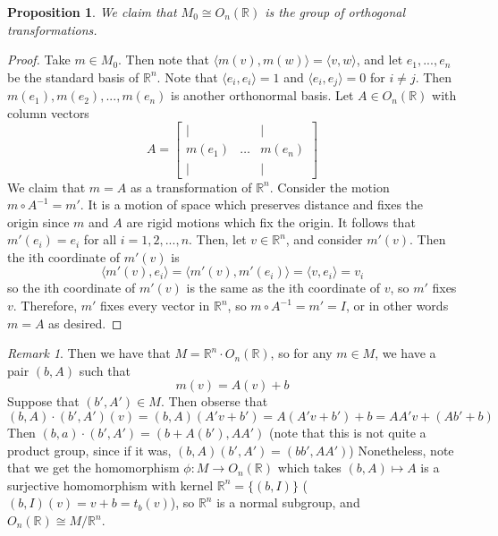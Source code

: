\documentclass[12pt]{article}
\newtheorem{prop}[thm]{Proposition}
\theoremstyle{definition}
\theoremstyle{remark}
\newtheorem{rmk}[thm]{Remark}
\numberwithin{equation}{section}
\newcommand\R{\mathbb R}    %
\begin{document}
\begin{prop}
        We claim that $M_0 \cong O_n(\R)$ is the group of orthogonal transformations.
\end{prop}
\begin{proof}
        Take $m \in M_0$. Then note that $\langle m(v), m(w)\rangle = \langle v,w\rangle$, and let $e_1,...,e_n$ be the standard basis of $\R^n$. Note that $\langle e_i,e_i\rangle = 1$ and $\langle e_i,e_j \rangle = 0$ for $i\neq j$. Then $m(e_1), m(e_2),...,m(e_n)$ is another orthonormal basis. Let $A \in O_n(\R)$ with column vectors \begin{equation}
                A = \begin{bmatrix} \Big\vert & & \Big\vert \\ m(e_1) & \hdots & m(e_n) \\ \Big\vert & & \Big\vert \end{bmatrix}
        \end{equation}
        We claim that $m = A$ as a transformation of $\R^n$. Consider the motion $m \circ A^{-1} = m'$. It is a motion of space which preserves distance and fixes the origin since $m$ and $A$ are rigid motions which fix the origin. It follows that $m'(e_i) = e_i$ for all $i = 1,2,...,n$. Then, let $v \in \R^n$, and consider $m'(v)$. Then the ith coordinate of $m'(v)$ is \begin{equation}
                \langle m'(v), e_i \rangle = \langle m'(v),m'(e_i)\rangle = \langle v,e_i\rangle = v_i
        \end{equation}
        so the ith coordinate of $m'(v)$ is the same as the ith coordinate of $v$, so $m'$ fixes $v$. Therefore, $m'$ fixes every vector in $\R^n$, so $m \circ A^{-1} = m' = I$, or in other words $m = A$ as desired.
\end{proof}

\vspace{15pt}


\begin{rmk}
        Then we have that $M = \R^n\cdot O_n(\R)$, so for any $m \in M$, we have a pair $(b,A)$ such that \begin{equation}
                m(v) = A(v) + b
        \end{equation}
        Suppose that $(b',A') \in M$. Then obserse that \begin{equation}
                (b,A)\cdot(b',A')(v) = (b,A)(A'v+b') = A(A'v+b')+b = AA'v + (Ab' + b)
        \end{equation}
        Then $(b,a)\cdot(b',A') = (b+A(b'),AA')$ (note that this is not quite a product group, since if it was, $(b,A)(b',A') = (bb',AA')$) Nonetheless, note that we get the homomorphism $\phi:M\rightarrow O_n(\R)$ which takes $(b,A)\mapsto A$ is a surjective homomorphism with kernel $\R^n=\{(b,I)\}$ ($(b,I)(v)=v+b=t_b(v)$), so $\R^n$ is a normal subgroup, and $O_n(\R) \cong M/\R^n$.
\end{rmk}
\end{document}

